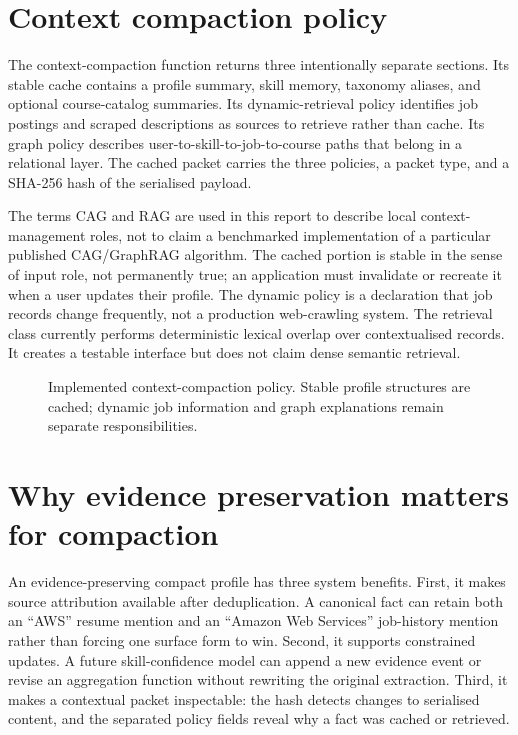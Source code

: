 \section[Context compaction policy]{\hspace{0.35em}Context compaction policy}

The context-compaction function returns three intentionally separate sections. Its stable cache contains a profile summary, skill memory, taxonomy aliases, and optional course-catalog summaries. Its dynamic-retrieval policy identifies job postings and scraped descriptions as sources to retrieve rather than cache. Its graph policy describes user-to-skill-to-job-to-course paths that belong in a relational layer. The cached packet carries the three policies, a packet type, and a SHA-256 hash of the serialised payload.

The terms CAG and RAG are used in this report to describe local context-management roles, not to claim a benchmarked implementation of a particular published CAG/GraphRAG algorithm. The cached portion is stable in the sense of input role, not permanently true; an application must invalidate or recreate it when a user updates their profile. The dynamic policy is a declaration that job records change frequently, not a production web-crawling system. The retrieval class currently performs deterministic lexical overlap over contextualised records. It creates a testable interface but does not claim dense semantic retrieval.

\begin{figure}[H]
\centering

\caption{Implemented context-compaction policy. Stable profile structures are cached; dynamic job information and graph explanations remain separate responsibilities.}
\label{fig:context-policy}
\end{figure}

\section{Why evidence preservation matters for compaction}

An evidence-preserving compact profile has three system benefits. First, it makes source attribution available after deduplication. A canonical  fact can retain both an ``AWS'' resume mention and an ``Amazon Web Services'' job-history mention rather than forcing one surface form to win. Second, it supports constrained updates. A future skill-confidence model can append a new evidence event or revise an aggregation function without rewriting the original extraction. Third, it makes a contextual packet inspectable: the hash detects changes to serialised content, and the separated policy fields reveal why a fact was cached or retrieved.

